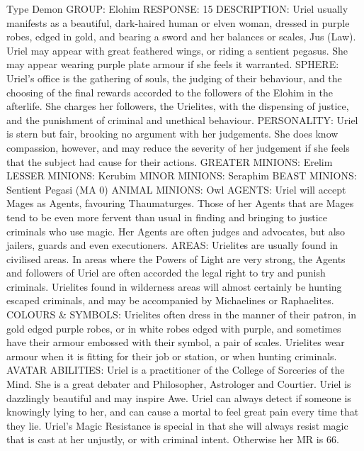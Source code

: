 \begin{Description}

\item[Type] Demon
GROUP: Elohim
RESPONSE: 15%
DESCRIPTION: Uriel usually manifests as a beautiful, dark-haired human or elven woman, dressed in purple robes, edged in gold, and bearing a sword and her balances or scales, Jus (Law). Uriel may appear with great feathered wings, or riding a sentient pegasus. She may appear wearing purple plate armour if she feels it warranted.
SPHERE: Uriel's office is the gathering of souls, the judging of their behaviour, and the choosing of the final rewards accorded to the followers of the Elohim in the afterlife. She charges her followers, the Urielites, with the dispensing of justice, and the punishment of criminal and unethical behaviour.
PERSONALITY: Uriel is stern but fair, brooking no argument with her judgements. She does know compassion, however, and may reduce the severity of her judgement if she feels that the subject had cause for their actions.
GREATER MINIONS: Erelim 
LESSER MINIONS: Kerubim 
MINOR MINIONS: Seraphim 
BEAST MINIONS: Sentient Pegasi (MA 0)
ANIMAL MINIONS: Owl
AGENTS: Uriel will accept Mages as Agents, favouring Thaumaturges. Those of her Agents that are Mages tend to be even more fervent than usual in finding and bringing to justice criminals who use magic. Her Agents are often judges and advocates, but also jailers, guards and even executioners.
AREAS: Urielites are usually found in civilised areas. In areas where the Powers of Light are very strong, the Agents and followers of Uriel are often accorded the legal right to try and punish criminals. Urielites found in wilderness areas will almost certainly be hunting escaped criminals, and may be accompanied by Michaelines or Raphaelites.
COLOURS \& SYMBOLS: Urielites often dress in the manner of their patron, in gold edged purple robes, or in white robes edged with purple, and sometimes have their armour embossed with their symbol, a pair of scales.  Urielites wear armour when it is fitting for their job or station, or when hunting criminals.
AVATAR ABILITIES: Uriel is a practitioner of the College of Sorceries of the Mind. She is a great debater and Philosopher, Astrologer and Courtier. Uriel is dazzlingly beautiful and may inspire Awe. Uriel can always detect if someone is knowingly lying to her, and can cause a mortal to feel great pain every time that they lie. Uriel's Magic Resistance is special in that she will always resist magic that is cast at her unjustly, or with criminal intent. Otherwise her MR is 66.


\end{Description}
